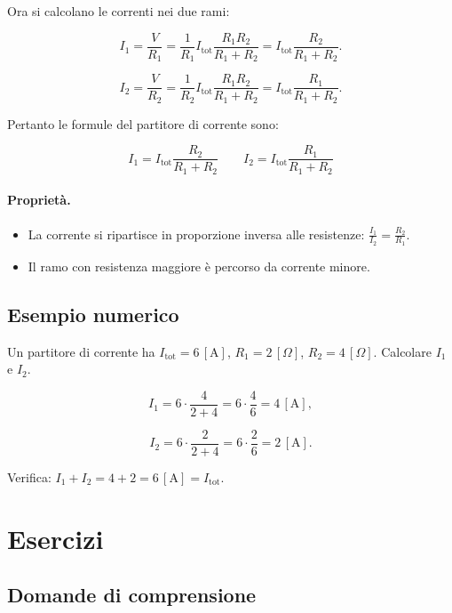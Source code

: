 Ora si calcolano le correnti nei due rami:

\[
I_1 = \frac{V}{R_1} = \frac{1}{R_1} I_{\text{tot}} \frac{R_1 R_2}{R_1 + R_2} = I_{\text{tot}} \frac{R_2}{R_1 + R_2}.
\]

\[
I_2 = \frac{V}{R_2} = \frac{1}{R_2} I_{\text{tot}} \frac{R_1 R_2}{R_1 + R_2} = I_{\text{tot}} \frac{R_1}{R_1 + R_2}.
\]

Pertanto le formule del partitore di corrente sono:

\[
\boxed{
I_1 = I_{\text{tot}} \frac{R_2}{R_1 + R_2}
}
\qquad
\boxed{
I_2 = I_{\text{tot}} \frac{R_1}{R_1 + R_2}
}
\]

\paragraph{Proprietà.}
\begin{itemize}[leftmargin=1cm]
  \item La corrente si ripartisce in proporzione inversa alle resistenze: \(\frac{I_1}{I_2} = \frac{R_2}{R_1}\).
  \item Il ramo con resistenza maggiore è percorso da corrente minore.
\end{itemize}

\subsection{Esempio numerico}

Un partitore di corrente ha \(I_{\text{tot}} = 6\,[\text{A}]\), \(R_1 = 2\,[\Omega]\), \(R_2 = 4\,[\Omega]\). Calcolare \(I_1\) e \(I_2\).

\[
I_1 = 6 \cdot \frac{4}{2+4} = 6 \cdot \frac{4}{6} = 4\,[\text{A}],
\]

\[
I_2 = 6 \cdot \frac{2}{2+4} = 6 \cdot \frac{2}{6} = 2\,[\text{A}].
\]

Verifica: \(I_1 + I_2 = 4 + 2 = 6\,[\text{A}] = I_{\text{tot}}\).



\section{Esercizi}

\subsection{Domande di comprensione}

